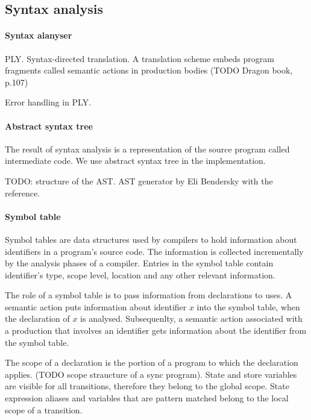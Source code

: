

\subsection{Syntax analysis}
  \paragraph{Syntax alanyser} PLY. Syntax-directed translation. A translation scheme embeds program fragments called semantic actions in production bodies (TODO Dragon book, p.107)

Error handling in PLY.


  \paragraph{Abstract syntax tree} The result of syntax analysis is a representation of the source program called intermediate code. We use abstract syntax tree in the implementation.

TODO: structure of the AST.
AST generator by Eli Bendersky with the reference.

  \paragraph{Symbol table}
Symbol tables are data structures used by compilers to hold information about identifiers in a program's source code. The information is collected incrementally by the analysis phases of a compiler. Entries in the symbol table contain identifier's type, scope level, location and any other relevant information.

The role of a symbol table is to pass information from declarations to uses. A semantic action puts information about identifier $x$ into the symbol table, when the declaration of $x$ is analysed. Subsequenlty, a semantic action associated with a production that involves an identifier gets information about the identifier from the symbol table.

The scope of a declaration is the portion of a program to which the declaration applies. (TODO scope straucture of a sync program). State and store variables are visible for all transitions, therefore they belong to the global scope. State expression aliases and variables that are pattern matched belong to the local scope of a transition.

